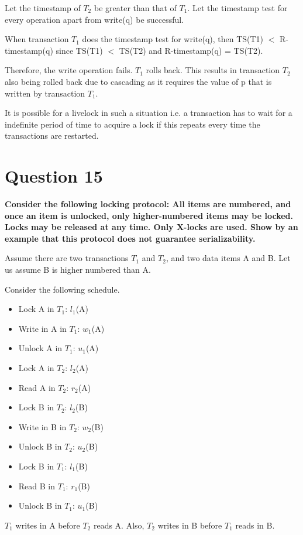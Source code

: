 \documentclass[12pt]{article}
\begin{document}
Let the timestamp of $T_2$ be greater than that of $T_1$. Let the timestamp test for every operation apart from write(q) be successful. 

When transaction $T_1$ does the timestamp test for write(q), then TS(T1) $<$ R-timestamp(q) since TS(T1) $<$ TS(T2) and R-timestamp(q) = TS(T2). 

Therefore, the write operation fails. $T_1$ rolls back. This results in transaction $T_2$ also being rolled back due to cascading as it requires the value of p that is written by transaction $T_1$.

It is possible for a livelock in such a situation i.e. a transaction has to wait for a indefinite period of time to acquire a lock if this repeats every time the transactions are restarted.

\section*{Question 15}
{\bfseries Consider the following locking protocol: All items are numbered, and once an item is unlocked, only higher-numbered items may be locked. Locks may be released at any time. Only X-locks are used. Show by an example that this protocol does not guarantee serializability.}

Assume there are two transactions $T_1$ and $T_2$, and two data items A and B. Let us assume B is higher numbered than A.

Consider the following schedule.
\begin{itemize}
    \item Lock A in $T_1$: $l_1$(A) 
    \item Write in A in $T_1$: $w_1$(A)
    \item Unlock A in $T_1$: $u_1$(A)
    \item Lock A in $T_2$: $l_2$(A)
    \item Read A in $T_2$: $r_2$(A) 
    \item Lock B in $T_2$: $l_2$(B)
    \item Write in B in $T_2$: $w_2$(B) 
    \item Unlock B in $T_2$: $u_2$(B) 
    \item Lock B in $T_1$: $l_1$(B) 
    \item Read B in $T_1$: $r_1$(B) 
    \item Unlock B in $T_1$: $u_1$(B)
\end{itemize}

$T_1$ writes in A before $T_2$ reads A. Also, $T_2$ writes in B before $T_1$ reads in B. 
\end{document}
